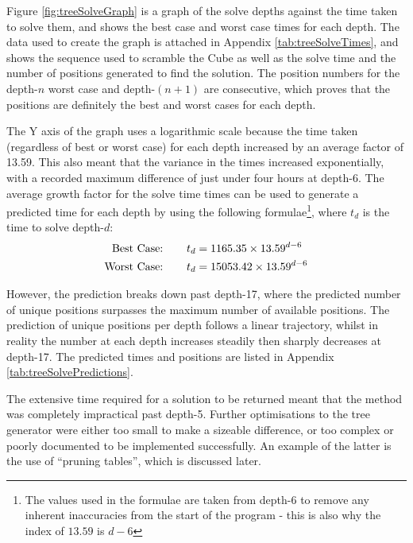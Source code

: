 \documentclass{report}
\newcommand{\depth}[1]{depth-#1}
\begin{document}
    Figure \ref{fig:treeSolveGraph} is a graph of the solve depths against the time taken to solve them, and shows the best case and worst case times for each depth. The data used to create the graph is attached in Appendix \ref{tab:treeSolveTimes}, and shows the sequence used to scramble the Cube as well as the solve time and the number of positions generated to find the solution. The position numbers for the \depth{$n$} worst case and \depth{$(n+1)$} are consecutive, which proves that the positions are definitely the best and worst cases for each depth.
    
    The Y axis of the graph uses a logarithmic scale because the time taken (regardless of best or worst case) for each depth increased by an average factor of 13.59. This also meant that the variance in the times increased exponentially, with a recorded maximum difference of just under four hours at \depth{6}. The average growth factor for the solve time times can be used to generate a predicted time for each depth by using the following formulae\footnote{The values used in the formulae are taken from \depth{6} to remove any inherent inaccuracies from the start of the program - this is also why the index of $13.59$ is $d-6$}, where $t_d$ is the time to solve \depth{$d$}:
   	\begin{align*}
   	\text{Best Case:}\hspace{7.5mm} 	&	t_d = 1165.35 \times 13.59^{d-6} \\
	\text{Worst Case:}\hspace{7.5mm}	&	t_d = 15053.42 \times 13.59^{d-6}
   	\end{align*}
   	
    However, the prediction breaks down past \depth{17}, where the predicted number of unique positions surpasses the maximum number of available positions. The prediction of unique positions per depth follows a linear trajectory, whilst in reality the number at each depth increases steadily then sharply decreases at \depth{17}. The predicted times and positions are listed in Appendix \ref{tab:treeSolvePredictions}.
    
    The extensive time required for a solution to be returned meant that the method was completely impractical past \depth{5}. Further optimisations to the tree generator were either too small to make a sizeable difference, or too complex or poorly documented to be implemented successfully. An example of the latter is the use of \enquote{pruning tables}, which is discussed later.
    
\end{document}
